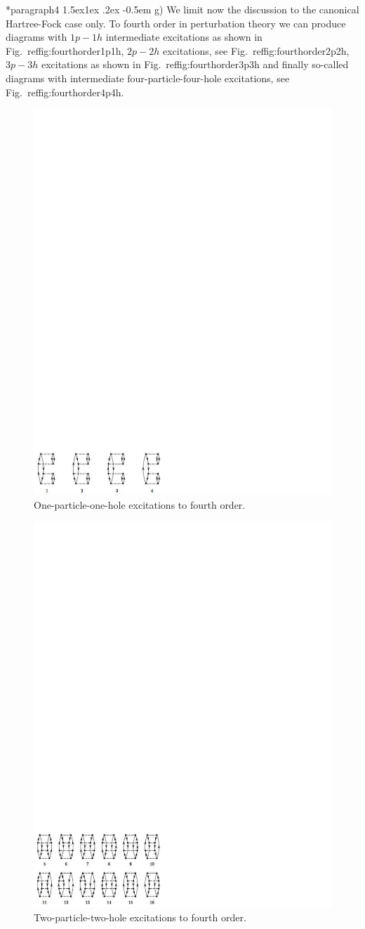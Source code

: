 \documentclass[%
twoside,                 %
final,                   %
10pt]{article}
\makeatletter
\newenvironment{doconceexercise}{}{}
\newcommand\subex{\@startsection*{paragraph}{4}{\z@}%
                  {1.5ex\@plus1ex \@minus.2ex}%
                  {-0.5em}%
                  {\normalfont\normalsize\bfseries}}
\makeatother
\begin{document}
\begin{doconceexercise}
\subex{g)}
We limit now the discussion to the canonical Hartree-Fock case only. To fourth order in perturbation theory we can produce diagrams with $1p-1h$ intermediate excitations as shown in Fig.~ref{fig:fourthorder1p1h}, $2p-2h$ excitations, see Fig.~ref{fig:fourthorder2p2h}, $3p-3h$ excitations as shown in Fig.~ref{fig:fourthorder3p3h} and finally so-called diagrams with intermediate four-particle-four-hole excitations, see Fig.~ref{fig:fourthorder4p4h}. 


\begin{figure}[t]
  \centerline{\includegraphics[width=0.6\linewidth]{fig-proj/1p1h.pdf}}
  \caption{
  One-particle-one-hole excitations to fourth order. \label{fig:fourthorder1p1h}
  }
\end{figure}



\begin{figure}[t]
  \centerline{\includegraphics[width=0.6\linewidth]{fig-proj/2p2h.pdf}}
  \caption{
  Two-particle-two-hole excitations to fourth order. \label{fig:fourthorder2p2h}
  }
\end{figure}




\end{doconceexercise}
\end{document}
